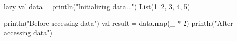 lazy val data = {
  println("Initializing data...")
  List(1, 2, 3, 4, 5)
}

println("Before accessing data")
val result = data.map(_ * 2)
println("After accessing data")